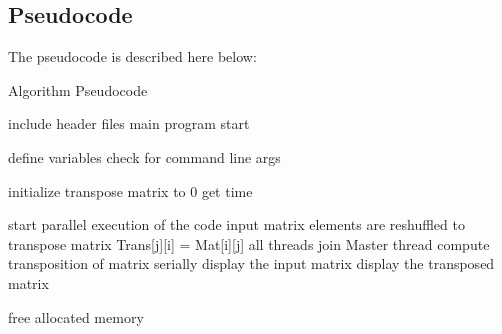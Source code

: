\documentclass{article}
\begin{document}
\subsection{Pseudocode}

The pseudocode is described here below:

\begin{algorithm}
\caption{Algorithm Pseudocode}
\SetAlgoLined
\DontPrintSemicolon


include header files\;
main program start {\;
define variables\;
check for command line args\;

initialize transpose matrix to 0\;
get time\;

start parallel execution of the code\;
input matrix elements are reshuffled to transpose matrix\;
Trans[j][i] = Mat[i][j]\;
all threads join Master thread\;
compute transposition of matrix serially\;
display the input matrix\;
display the transposed matrix\;

free allocated memory\;
}
\end{algorithm}
\end{document}
